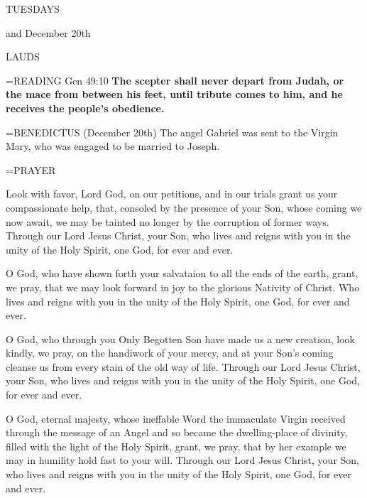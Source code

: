 \begin{center}
\normalsize \begin{center}\normalsize TUESDAYS\\
\end{center}
\footnotesize and December 20th\\
\end{center}

\begin{flushleft}\normalsize LAUDS\\\end{flushleft}

\hangindent=\parindent \small{READING} Gen 49:10 \textbf{The scepter shall never depart from Judah, or the mace from between his feet, until tribute comes to him, and he receives the people’s obedience.\\}

\hangindent=\parindent \small{BENEDICTUS  (December 20th) The angel Gabriel was sent to the Virgin Mary, who was engaged to be married to Joseph.\\}

\hangindent=\parindent \small PRAYER
\begin{description}[labelindent=\parindent, noitemsep, leftmargin=*]
\item [Week 1:]  Look with favor, Lord God, on our petitions, and in our trials grant us your compassionate help, that, consoled by the presence of your Son, whose coming we now await, we may be tainted no longer by the corruption of former ways. Through our Lord Jesus Christ, your Son, who lives and reigns with you in the unity of the Holy Spirit, one God, for ever and ever.
\item [Week 2:]  O God, who have shown forth your salvataion to all the ends of the earth, grant, we pray, that we may look forward in joy to the glorious Nativity of Christ. Who lives and reigns with you in the unity of the Holy Spirit, one God, for ever and ever.
\item [Week 3:]  O God, who through you Only Begotten Son have made us a new creation, look kindly, we pray, on the handiwork of your mercy, and at your Son's coming cleanse us from every stain of the old way of life. Through our Lord Jesus Christ, your Son, who lives and reigns with you in the unity of the Holy Spirit, one God, for ever and ever.
\item [December 20th:]  O God, eternal majesty, whose ineffable Word the immaculate Virgin received through the message of an Angel and so became the dwelling-place of divinity, filled with the light of the Holy Spirit, grant, we pray, that by her example we may in humility hold fast to your will. Through our Lord Jesus Christ, your Son, who lives and reigns with you in the unity of the Holy Spirit, one God, for ever and ever.
\end{description}


